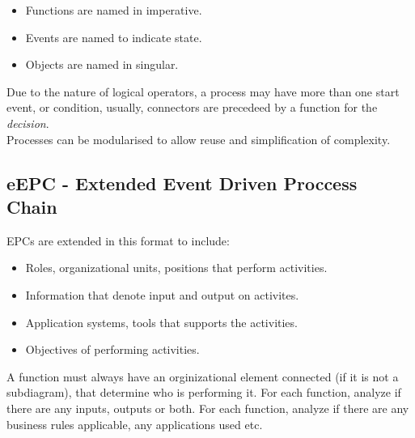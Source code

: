 \documentclass[11pt,a4paper,twocolumn]{book}
\begin{document}
\begin{itemize}
\item Functions are named in imperative.
\item Events are named to indicate state.
\item Objects are named in singular.
\end{itemize}

Due to the nature of logical operators, a process may have more than one start event, or condition, usually, connectors are precedeed by a function for the \textit{decision}.\\

Processes can be modularised to allow reuse and simplification of complexity.

\subsection{eEPC - Extended Event Driven Proccess Chain}

EPCs are extended in this format to include:

\begin{itemize}
\item Roles, organizational units, positions that perform activities.
\item Information that denote input and output on activites.
\item Application systems, tools that supports the activities.
\item Objectives of performing activities.
\end{itemize}

A function must always have an orginizational element connected (if it is not a subdiagram), that determine who is performing it. For each function, analyze if there are any inputs, outputs or both. For each function, analyze if there are any business rules applicable, any applications used etc.
\end{document}
